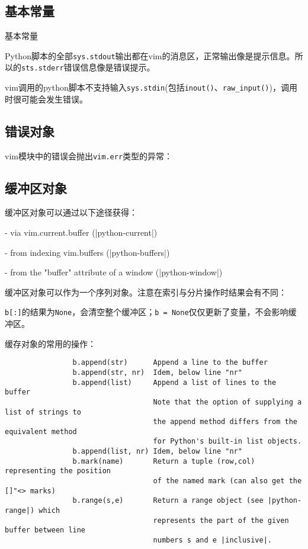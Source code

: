 		\subsection{基本常量}

			基本常量

			

			Python脚本的全部\verb|sys.stdout|输出都在vim的消息区，正常输出像是提示信息。所以的\verb|sts.stderr|错误信息像是错误提示。

			vim调用的python脚本不支持输入\verb|sys.stdin|(包括\verb|inout()|、\verb|raw_input()|)，调用时很可能会发生错误。

		\subsection{错误对象}

			vim模块中的错误会抛出\verb|vim.err|类型的异常：

			

		\subsection{缓冲区对象}

			缓冲区对象可以通过以下途径获得：

			- via vim.current.buffer (|python-current|)

			- from indexing vim.buffers (|python-buffers|)

			- from the "buffer" attribute of a window (|python-window|)

			缓冲区对象可以作为一个序列对象。注意在索引与分片操作时结果会有不同：
			
			\verb|b[:]|的结果为\verb|None|，会清空整个缓冲区；\verb|b = None|仅仅更新了变量，不会影响缓冲区。

			缓存对象的常用的操作：
			\begin{verbatim}
				b.append(str)      Append a line to the buffer
				b.append(str, nr)  Idem, below line "nr"
				b.append(list)     Append a list of lines to the buffer
				                   Note that the option of supplying a list of strings to
				                   the append method differs from the equivalent method
				                   for Python's built-in list objects.
				b.append(list, nr) Idem, below line "nr"
				b.mark(name)       Return a tuple (row,col) representing the position
				                   of the named mark (can also get the []"<> marks)
				b.range(s,e)       Return a range object (see |python-range|) which
				                   represents the part of the given buffer between line
				                   numbers s and e |inclusive|.
			\end{verbatim}


